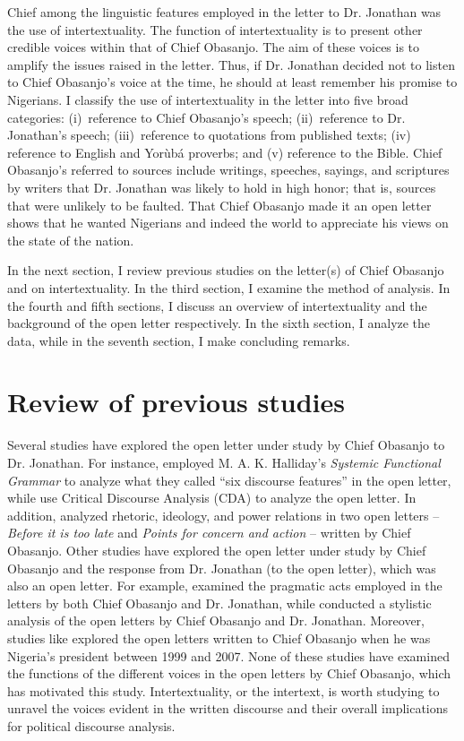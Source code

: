 \documentclass[output=paper,colorlinks,citecolor=brown]{langscibook}
\begin{document}
Chief among the linguistic features employed in the letter to Dr. Jonathan was the use of intertextuality. The function of intertextuality is to present other credible voices within that of Chief Obasanjo. The aim of these voices is to amplify the issues raised in the letter. Thus, if Dr. Jonathan decided not to listen to Chief Obasanjo’s voice at the time, he should at least remember his promise to Nigerians. I classify the use of intertextuality in the letter into five broad categories: (i)~reference to Chief Obasanjo’s speech; (ii)~reference to Dr. Jonathan’s speech; (iii)~reference to quotations from published texts; (iv) reference to English and Yorùbá proverbs; and (v) reference to the Bible. Chief Obasanjo's referred to sources include writings, speeches, sayings, and scriptures by writers that Dr. Jonathan was likely to hold in high honor; that is, sources that were unlikely to be faulted. That Chief Obasanjo made it an open letter shows that he wanted Nigerians and indeed the world to appreciate his views on the state of the nation. 

In the next section, I review previous studies on the letter(s) of Chief Obasanjo and on intertextuality. In the third section, I examine the method of analysis. In the fourth and fifth sections, I discuss an overview of intertextuality and the background of the open letter respectively. In the sixth section, I analyze the data, while in the seventh section, I make concluding remarks.

\section{Review of previous studies}

Several studies have explored the open letter under study by Chief Obasanjo to Dr. Jonathan. For instance, \citet{Ojoetal2022} employed M. A. K. Halliday’s \textit{Systemic Functional Grammar} to analyze what they called ``six discourse features'' in the open letter, while \citet{EkhareafoAmbrose2015} use Critical Discourse Analysis (CDA) to analyze the open letter. In addition, \citet{FawunmiTaiwo2021} analyzed rhetoric, ideology, and power relations in two open letters – \textit{Before it is too late} and \textit{Points for concern and action} – written by Chief Obasanjo. Other studies have explored the open letter under study by Chief Obasanjo and the response from Dr. Jonathan (to the open letter), which was also an open letter. For example, \citet{UnuabonahBoluwaduro2020} examined the pragmatic acts employed in the letters by both Chief Obasanjo and Dr. Jonathan, while \citet{Monehin2015} conducted a stylistic analysis of the open letters by Chief Obasanjo and Dr. Jonathan. Moreover, studies like \citet{IgwebuikeKamalu2015} explored the open letters written to Chief Obasanjo when he was Nigeria’s president between 1999 and 2007. None of these studies have examined the functions of the different voices in the open letters by Chief Obasanjo, which has motivated this study. Intertextuality, or the intertext, is worth studying to unravel the voices evident in the written discourse and their overall implications for political discourse analysis. 
\end{document}

